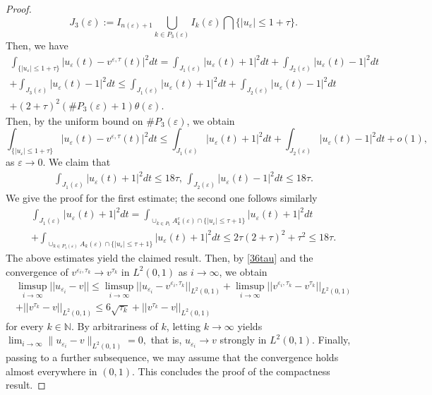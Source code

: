 \documentclass[10pt,a4paper]{amsart}
\begin{document}
\begin{proof}
\begin{equation*}
    J_{3}(\varepsilon):=I_{n(\varepsilon)+1}\bigcup_{k\in P_{3}(\varepsilon)}I_{k}(\varepsilon)\bigcap \{\left|u_{\varepsilon}\right|\le{1+\tau\}}.
\end{equation*}
Then, we have 
\begin{multline*}
    \int_{\{\left|u_{\varepsilon}\right|\le1+\tau\}}\left|u_{\varepsilon}(t)-v^{\varepsilon,\tau}(t)\right|^2dt= \int_{J_{1}(\varepsilon)}\left|u_{\varepsilon}(t)+1\right|^2dt+\int_{J_{2}(\varepsilon)}\left|u_{\varepsilon}(t)-1\right|^2dt\\+\int_{J_{3}(\varepsilon)}\left|u_{\varepsilon}(t)-1\right|^2dt\le\int_{J_{1}(\varepsilon)}\left|u_{\varepsilon}(t)+1\right|^2dt+\int_{J_{2}(\varepsilon)}\left|u_{\varepsilon}(t)-1\right|^2dt\\+(2+\tau)^{2}(\#P_{3}(\varepsilon)+1)\theta(\varepsilon).
\end{multline*}
Then, by the uniform bound on $\#P_3(\varepsilon)$, we obtain
\begin{equation*}
\int_{\{\left|u_{\varepsilon}\right|\le1+\tau\}}
\left|u_{\varepsilon}(t)-v^{\varepsilon,\tau}(t)\right|^2dt
\le\int_{J_{1}(\varepsilon)}
\left|u_{\varepsilon}(t)+1\right|^2dt+\int_{J_{2}(\varepsilon)}
\left|u_{\varepsilon}(t)-1\right|^2dt+o(1),
\end{equation*}
as $\varepsilon\to0$. We claim that 
\begin{align*}
     \int_{J_{1}(\varepsilon)}\left|u_{\varepsilon}(t)+1\right|^2dt\le18\tau,\,\int_{J_{2}(\varepsilon)}\left|u_{\varepsilon}(t)-1\right|^2dt\le18\tau.
\end{align*}
We give the proof for the first estimate; the second one follows similarly
 \begin{multline*}
     \int_{J_{1}(\varepsilon)}\left|u_{\varepsilon}(t)+1\right|^2dt=\int_{\cup_{k\in P_{1}}A^{c}_k(\varepsilon)\cap\{\left|u_{\varepsilon}\right|\le\tau+1\}}\left|u_{\varepsilon}(t)+1\right|^2dt\\+\int_{\cup_{k\in P_{1}(\varepsilon)}A_k(\varepsilon)\cap\{\left|u_{\varepsilon}\right|\le\tau+1\}}\left|u_{\varepsilon}(t)+1\right|^2dt\le2\tau(2+\tau)^{2}+\tau^{2}\le18\tau.
 \end{multline*}
 The above estimates yield the claimed result. Then, by \eqref{36tau} and the convergence of $v^{\varepsilon_i,\tau_k}\to v^{\tau_k}$ in $L^{2}(0,1)$ as $i\to\infty$, we obtain
\begin{multline*} \limsup_{i\to\infty}||u_{\varepsilon_{i}}-v|| \le\limsup_{i\to\infty}||u_{\varepsilon_{i}}-v^{\varepsilon_{i},\tau_{k}}||_{L^{2}(0,1)}+\limsup_{i\to\infty}||v^{\varepsilon_{i},\tau_{k}}-v^{\tau_{k}}||_{L^{2}(0,1)}\\+||v^{\tau_{k}}-v||_{L^{2}(0,1)}\le6\sqrt{\tau_{k}}+||v^{\tau_{k}}-v||_{L^{2}(0,1)} 
\end{multline*}
for every $k \in \mathbb{N}$. By arbitrariness of $k$, letting $k \to \infty$ yields $\lim_{i\to\infty} \|u_{\varepsilon_i}-v\|_{L^2(0,1)} = 0,$ that is, $u_{\varepsilon_i} \to v$ strongly in $L^2(0,1)$. Finally, passing to a further subsequence, we may assume that the convergence holds almost everywhere in $(0,1)$. This concludes the proof of the compactness result.
\end{proof}
\end{document}
